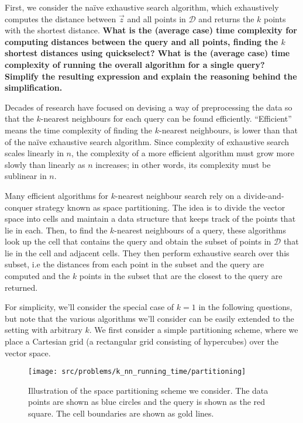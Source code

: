 \documentclass[preview]{standalone}
\begin{document}
\begin{Parts}
\Part First, we consider the na\"{i}ve exhaustive search algorithm, which exhaustively computes the distance between $\vec{z}$ and all points in $\mathcal{D}$ and returns the $k$ points with the shortest distance. {\bf What is the (average case) time complexity for computing distances between the query and all points, finding the $k$ shortest distances using quickselect? What is the (average case) time complexity of running the overall algorithm for a single query? Simplify the resulting expression and explain the reasoning behind the simplification. }



\Part Decades of research have focused on devising a way of preprocessing the data so that the $k$-nearest neighbours for each query can be found efficiently. ``Efficient'' means the time complexity of finding the $k$-nearest neighbours, is lower than that of the na\"{i}ve exhaustive search algorithm. Since complexity of exhaustive search scales linearly in $n$, the complexity of a more efficient algorithm must grow more slowly than linearly as $n$ increases; in other words, its complexity must be sublinear in $n$.

Many efficient algorithms for $k$-nearest neighbour search rely on a divide-and-conquer strategy known as space partitioning. The idea is to divide the vector space into cells and maintain a data structure that keeps track of the points that lie in each. Then, to find the $k$-nearest neighbours of a query, these algorithms look up the cell that contains the query and obtain the subset of points in $\mathcal{D}$ that lie in the cell and adjacent cells. They then perform exhaustive search over this subset, i.e the distances from each point in the subset and the query are computed and the $k$ points in the subset that are the closest to the query are returned.

For simplicity, we'll consider the special case of $k = 1$ in the following questions, but note that the various algorithms we'll consider can be easily extended to the setting with arbitrary $k$. We first consider a simple partitioning scheme, where we place a Cartesian grid (a rectangular grid consisting of hypercubes) over the vector space.

\begin{figure}[h]
    \centering
    \texttt{[image: src/problems/k\_nn\_running\_time/partitioning]}
    \caption{Illustration of the space partitioning scheme we consider. The data points are shown as blue circles and the query is shown as the red square. The cell boundaries are shown as gold lines.}
\end{figure}



\end{Parts}
\end{document}
